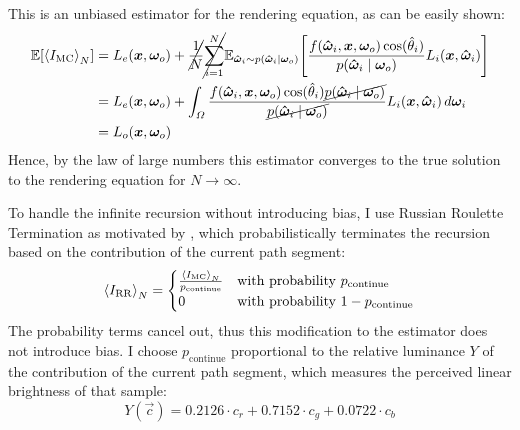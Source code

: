 This is an unbiased estimator for the rendering equation, as can be easily shown:
\begin{equation}
    \begin{aligned}
        \expectation{\estimator{I_\mathrm{MC}}}
        &= L_e(\vec{x}, \wo) + \cancel{\frac{1}{N}} \cancel{\sum_{i=1}^{N}} \expectationvar{\vec{\hat{\omega}}_i \sim p(\vec{\hat{\omega}}_i \mid \wo)}{\frac{f(\vec{\hat{\omega}}_i, \vec{x}, \wo) \cos(\hat{\theta}_i)}{p(\vec{\hat{\omega}}_i \mid \wo)} L_i(\vec{x}, \vec{\hat{\omega}}_i)} \\
        &= L_e(\vec{x}, \wo) + \int_{\Omega} \frac{f(\vec{\hat{\omega}}_i, \vec{x}, \wo) \cos(\hat{\theta}_i) \cancel{p(\vec{\hat{\omega}}_i \mid \wo)}}{\cancel{p(\vec{\hat{\omega}}_i \mid \wo)}} L_i(\vec{x}, \vec{\hat{\omega}}_i) \diff\wi \\
        &= L_o(\vec{x}, \wo)
    \end{aligned}
\end{equation}
Hence, by the law of large numbers this estimator converges to the true solution to the rendering equation for $N \to \infty$.

To handle the infinite recursion without introducing bias, I use Russian Roulette Termination as motivated by \textcite{veach1997}, which probabilistically terminates the recursion based on the contribution of the current path segment:
\begin{equation}
\label{eq:rr}
    \estimator{I_\mathrm{RR}} =
    \begin{cases}
        \frac{\estimator{I_\mathrm{MC}}}{p_\mathrm{continue}} & \text{with probability } p_\mathrm{continue} \\
        0 & \text{with probability } 1 - p_\mathrm{continue}
    \end{cases}
\end{equation}
The probability terms cancel out, thus this modification to the estimator does not introduce bias.
I choose $p_\mathrm{continue}$ proportional to the relative luminance $Y$ \parencite{kirkpatrick2025} of the contribution of the current path segment, which measures the perceived linear brightness of that sample:
\begin{equation}
\label{eq:luminance}
    Y(\vec{c}) = 0.2126 \cdot c_r + 0.7152 \cdot c_g + 0.0722 \cdot c_b
\end{equation}


